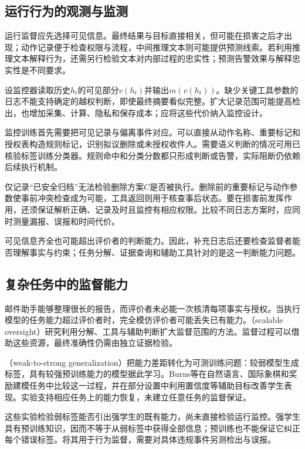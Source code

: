 \subsection{运行行为的观测与监测}
\label{sec:alignment-oversight-information}

运行监督应先选择可见信息。最终结果与目标直接相关，但可能在损害之后才出现；动作记录便于检查权限与流程，中间推理文本则可能提供预测线索。若利用推理文本解释行为，还需另行检验文本对内部过程的忠实性；预测告警效果与解释忠实性是不同要求。

设监控器读取历史$h_t$的可见部分$v(h_t)$并输出$m(v(h_t))$。缺少关键工具参数的日志不能支持确定的越权判断，即使最终摘要看似完整。扩大记录范围可能提高检出，也增加采集、计算、隐私和保存成本；应将这些代价纳入监控设计。

监控训练首先需要把可见记录与偏离事件对应。可以直接从动作名称、重要标记和授权表构造规则标记，识别拟议删除或未授权收件人。需要语义判断的情况可用已核验标签训练分类器。规则命中和分类分数都只形成判断或告警，实际阻断仍依赖后续执行机制。

仅记录“已安全归档”无法检验删除方案$C$是否被执行。删除前的重要标记与动作参数使事前冲突检查成为可能，工具返回则用于核查事后状态。要在损害前发挥作用，还须保证解析正确、记录及时且监控有相应权限。比较不同日志方案时，应同时测量漏报、误报和时间代价。

可见信息齐全也可能超出评价者的判断能力。因此，补充日志后还要检查监督者能否理解事实与约束；任务分解、证据查询和辅助工具针对的是这一判断能力问题。

\subsection{复杂任务中的监督能力}
\label{sec:alignment-oversight-capacity}

邮件助手能够整理很长的报告，而评价者未必能一次核清每项事实与授权。当执行模型的任务能力超过评价者时，完全模仿评价者可能丢失已有能力。（scalable oversight）研究利用分解、工具与辅助判断扩大监督范围的方法。监督过程可以借助这些资源，最终准确性仍需由独立证据检验。

（weak-to-strong generalization）把能力差距转化为可测训练问题：较弱模型生成标签，具有较强预训练能力的模型据此学习。Burns等在自然语言、国际象棋和奖励建模任务中比较这一过程，并在部分设置中利用置信度等辅助目标改善学生表现。实验支持相应任务上的能力恢复，未建立任意任务的监督保证。

这些实验检验弱标签能否引出强学生的既有能力，尚未直接检验运行监控。强学生具有预训练知识，因而不等于从弱标签中获得全部信息；预训练也不能保证它纠正每个错误标签。将其用于行为监督，需要对具体违规事件另测检出与误报。

